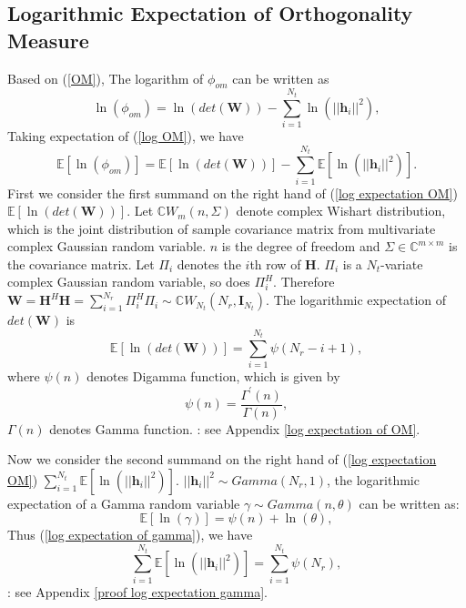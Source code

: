 \documentclass[12pt, draftclsnofoot, onecolumn]{IEEEtran}
\begin{document}
\subsection{Logarithmic Expectation of Orthogonality Measure}
Based on (\ref{OM}), The logarithm of $\phi_{om}$ can be written as 
\begin{equation}
\ln(\phi_{om})=\ln(det(\mathbf{W}))-\sum_{i=1}^{N_{t}}\ln(||\mathbf{h}_{i}||^{2}),
\label{log OM}
\end{equation}
Taking expectation of (\ref{log OM}), we have 
\begin{equation}
\mathbb{E}[\ln(\phi_{om})]=\mathbb{E}[\ln(det(\mathbf{W}))]-\sum_{i=1}^{N_{t}}\mathbb{E}[\ln(||\mathbf{h}_{i}||^{2})].
\label{log expectation OM}
\end{equation}
First we consider the first summand on the right hand of (\ref{log expectation OM}) $\mathbb{E}[\ln(det(\mathbf{W}))]$. Let $\mathbb{C}W_{m}(n, \Sigma)$ denote complex Wishart distribution, which is the joint distribution of sample covariance matrix from multivariate complex Gaussian random variable\cite{goodman1963statistical}. $n$ is the degree of freedom and $\Sigma\in \mathbb{C}^{m\times m}$ is the covariance matrix. Let $\Pi_{i}$ denotes the $i$th row of $\mathbf{H}$. $\Pi_{i}$ is a $N_{t}$-variate complex Gaussian random variable, so does $\Pi_{i}^{H}$. Therefore $\mathbf{W}=\mathbf{H}^{H}\mathbf{H}=\sum_{i=1}^{N_{r}}\Pi_{i}^{H}\Pi_{i}\sim \mathbb{C}W_{N_{t}}(N_{r}, \mathbf{I}_{N_{t}})$. The logarithmic expectation of $det(\mathbf{W})$ is
\begin{equation}
\mathbb{E}[\ln(det(\mathbf{W}))]=\sum_{i=1}^{N_{t}}\psi(N_{r}-i+1),
\label{log expectation of wishart}
\end{equation}
where $\psi(n)$ denotes Digamma function, which is given by\cite{papoulis2002probability}
\begin{equation}
\psi(n)=\frac{\Gamma^{'}(n)}{\Gamma(n)},
\label{Digmma function}
\end{equation}
$\Gamma(n)$ denotes Gamma function\cite{papoulis2002probability}.
\proof: see Appendix \ref{log expectation of OM}.

Now we consider the second summand on the right hand of (\ref{log expectation OM}) $\sum_{i=1}^{N_{t}}\mathbb{E}[\ln(||\mathbf{h}_{i}||^{2})]$. $||\mathbf{h}_{i}||^{2}\sim Gamma(N_{r}, 1)$, the logarithmic expectation of a Gamma random variable $\gamma\sim Gamma(n, \theta)$ can be written as:
\begin{equation}
\mathbb{E}[\ln(\gamma)]=\psi(n)+\ln(\theta),
\label{log expectation of gamma}
\end{equation}
Thus (\ref{log expectation of gamma}), we have
\begin{equation}
\sum_{i=1}^{N_{t}}\mathbb{E}[\ln(||\mathbf{h}_{i}||^{2})]=\sum_{i=1}^{N_{t}}\psi(N_{r}),
\label{sum of log expectation gamma}
\end{equation}
\proof: see Appendix \ref{proof log expectation gamma}.
\end{document}
